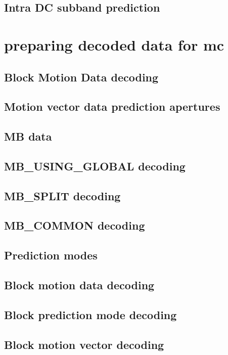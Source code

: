 \subsection{Intra DC subband prediction}

\clearpage
\section{preparing decoded data for mc}
\subsection{Block Motion Data decoding}
\subsection{Motion vector data prediction apertures}
\subsection{MB data}
\subsection{MB\_USING\_GLOBAL decoding}
\subsection{MB\_SPLIT decoding}
\subsection{MB\_COMMON decoding}
\subsection{Prediction modes}
\subsection{Block motion data decoding}
\subsection{Block prediction mode decoding}
\subsection{Block motion vector decoding}
